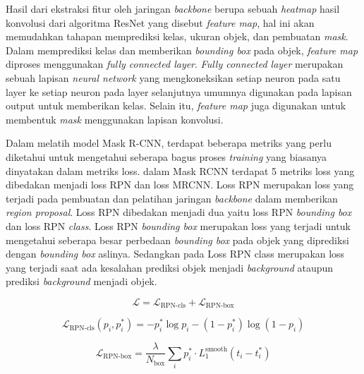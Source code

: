 Hasil dari ekstraksi fitur oleh jaringan \textit{backbone} berupa sebuah \textit{heatmap} hasil konvolusi
dari algoritma ResNet yang disebut \textit{feature map}, hal ini akan memudahkan tahapan memprediksi kelas, ukuran objek, dan pembuatan \textit{mask}.
Dalam memprediksi kelas dan memberikan \textit{bounding box} pada objek, \textit{feature map} diproses
menggunakan \textit{fully connected layer}. \textit{Fully connected layer} merupakan sebuah lapisan
\textit{neural network} yang mengkoneksikan setiap neuron pada satu layer ke setiap neuron pada layer selanjutnya
umumnya digunakan pada lapisan output untuk memberikan kelas. Selain itu, \textit{feature map} juga digunakan
untuk membentuk \textit{mask} menggunakan lapisan konvolusi.

Dalam melatih model Mask R-CNN, terdapat beberapa metriks yang perlu diketahui untuk mengetahui
seberapa bagus proses \textit{training} yang biasanya dinyatakan dalam metriks loss. dalam Mask RCNN
terdapat 5 metriks loss yang dibedakan menjadi loss RPN dan loss MRCNN. Loss RPN merupakan loss yang terjadi pada pembuatan dan pelatihan jaringan \textit{backbone}
dalam memberikan \textit{region proposal}. Loss RPN dibedakan menjadi dua yaitu loss RPN \textit{bounding box}
dan loss RPN \textit{class}. Loss RPN \textit{bounding box} merupakan loss yang terjadi untuk mengetahui
seberapa besar perbedaan \textit{bounding box} pada objek yang diprediksi dengan \textit{bounding box}
aslinya. Sedangkan pada Loss RPN class merupakan loss yang terjadi saat ada kesalahan prediksi objek menjadi
\textit{background} ataupun prediksi \textit{background} menjadi objek.

\begin{equation}
    \label{eq :loss}
    \mathcal{L} = \mathcal{L}_\text{RPN-cls} + \mathcal{L}_\text{RPN-box}
\end{equation}

\begin{equation}
    \label{eq :cls_loss}
    \mathcal{L}_\text{RPN-cls} (p_i, p^*_i) = - p^*_i \log p_i - (1 - p^*_i) \log (1 - p_i)
\end{equation}

\begin{equation}
    \label{eq :bbox loss}
    \mathcal{L}_\text{RPN-box} = \frac{\lambda}{N_\text{box}} \sum_i p^*_i \cdot L_1^\text{smooth}(t_i - t^*_i)
\end{equation}

